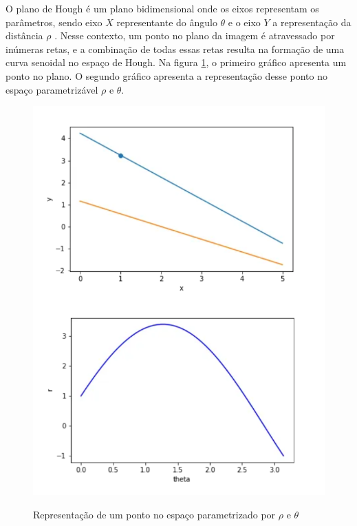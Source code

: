 O plano de Hough é um plano bidimensional onde os eixos representam os parâmetros, sendo eixo $X$ representante do ângulo $\theta$ e o eixo $Y$ a representação da distância $\rho$ \cite{transformadaHough1}. Nesse contexto, um ponto no plano da imagem é atravessado por inúmeras retas, e a combinação de todas essas retas resulta na formação de uma curva senoidal no espaço de Hough\cite{detectBar}. Na figura \ref{fig:Representacao de um ponto no espaco parametrizavel}, o primeiro gráfico apresenta um ponto no plano. O segundo gráfico apresenta a representação desse ponto no espaço parametrizável $\rho$ e $\theta$.

\begin{figure}[!htb]
	\centering
    \caption{Representação de um ponto no espaço parametrizado por $\rho$ e $\theta$}
	\includegraphics[scale=0.5]{figuras/math/pontoEspacoParametrizavel.png}
	\label{fig:Representacao de um ponto no espaco parametrizavel}
\end{figure}

